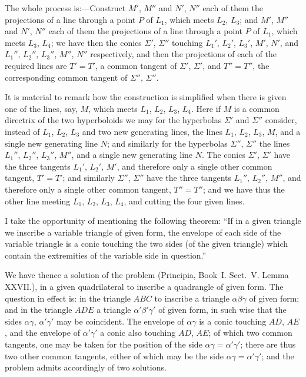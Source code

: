 \documentclass[11pt,a4paper]{article}
\theoremstyle{plain}
\theoremstyle{definition}
\begin{document}
The whole process is:---Construct $M'$, $M''$ and $N'$, $N''$ each of them the projections
of a line through a point $P$ of $L_1$, which meets $L_2$, $L_3$; and $M'$, $M''$ and $N'$, $N''$ each
of them the projections of a line through a point $P$ of $L_1$, which meets $L_3$, $L_4$; we
have then the conics $\Sigma'$, $\Sigma''$ touching $L_1'$, $L_2'$, $L_3'$, $M'$, $N'$, and $L_1''$, $L_2''$, $L_3''$,
$M''$, $N''$ respectively, and then the projections of each of the required lines are
$T' = T'$, a common tangent of $\Sigma'$, $\Sigma'$, and $T'' = T''$, the corresponding common
tangent of $\Sigma''$, $\Sigma''$.

It is material to remark how the construction is simplified when there is given
one of the lines, say, $M$, which meets $L_1$, $L_2$, $L_3$, $L_4$.  Here if $M$ is a common
directrix of the two hyperboloids we may for the hyperbolas $\Sigma'$ and $\Sigma''$ consider,
instead of $L_1$, $L_2$, $L_3$ and two new generating lines, the lines $L_1$, $L_2$, $L_3$, $M$, and a
single new generating line $N$; and similarly for the hyperbolas $\Sigma''$, $\Sigma''$ the lines
$L_1''$, $L_2''$, $L_3''$, $M''$, and a single new generating line $N$.  The conics $\Sigma'$, $\Sigma'$ have
the three tangents $L_1'$, $L_2'$, $M'$, and therefore only a single other common tangent,
$T' = T'$; and similarly $\Sigma''$, $\Sigma''$ have the three tangents $L_1''$, $L_2''$, $M''$, and therefore
only a single other common tangent, $T'' = T''$; and we have thus the other line
meeting $L_1$, $L_2$, $L_3$, $L_4$, and cutting the four given lines.

I take the opportunity of mentioning the following theorem: ``If in a given
triangle we inscribe a variable triangle of given form, the envelope of each side of
the variable triangle is a conic touching the two sides (of the given triangle) which
contain the extremities of the variable side in question.''

We have thence a solution of the problem (Principia, Book~I. Sect.~V. Lemma
XXVII.), in a given quadrilateral to inscribe a quadrangle of given form.  The
question in effect is: in the triangle $ABC$ to inscribe a triangle $\alpha\beta\gamma$ of given form;
and in the triangle $ADE$ a triangle $\alpha'\beta'\gamma'$ of given form, in such wise that the sides
$\alpha\gamma$, $\alpha'\gamma'$ may be coincident.  The envelope of $\alpha\gamma$ is a conic touching $AD$, $AE$,
and the envelope of $\alpha'\gamma'$ a conic also touching $AD$, $AE$; of which two common
tangents, one may be taken for the position of the side $\alpha\gamma = \alpha'\gamma'$; there are thus
two other common tangents, either of which may be the side $\alpha\gamma = \alpha'\gamma'$; and the
problem admits accordingly of two solutions.
\end{document}
